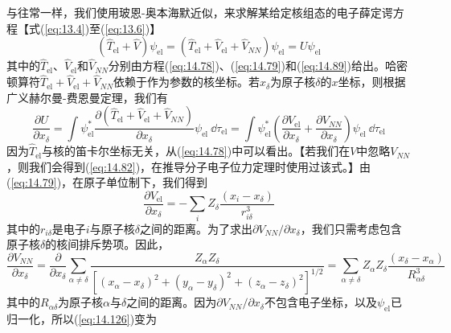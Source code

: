     与往常一样，我们使用玻恩-奥本海默近似，来求解某给定核组态的电子薛定谔方程【式(\ref{eq:13.4})至(\ref{eq:13.6})】
    \begin{equation*}
        \left(\hat{T}_{\text{el}} + \hat{V}\right) \psi_{\text{el}} = \left(\hat{T}_{\text{el}} + \hat{V}_{\text{el}} + \hat{V}_{NN}\right) \psi_{\text{el}} = U \psi_{\text{el}}
    \end{equation*}
    其中的$\hat{T}_{\text{el}}$、$\hat{V}_{\text{el}}$和$\hat{V}_{NN}$分别由方程(\ref{eq:14.78})、(\ref{eq:14.79})和(\ref{eq:14.89})给出。哈密顿算符$\hat{T}_{\text{el}} + \hat{V}_{\text{el}} + \hat{V}_{NN}$依赖于作为参数的核坐标。若$x_{\delta}$为原子核$\delta$的$x$坐标，则根据广义赫尔曼-费恩曼定理，我们有
    \begin{equation}
        \frac{\partial U}{\partial x_{\delta}} = \int \psi_{\text{el}}^* \frac{\partial\left(\hat{T}_{\text{el}} + \hat{V}_{\text{el}} + \hat{V}_{NN}\right)}{\partial x_{\delta}} \psi_{\text{el}} \:\dd \tau_{\text{el}} = \int \psi_{\text{el}}^* \left(\frac{\partial V_{\text{el}}}{\partial x_{\delta}} + \frac{\partial V_{NN}}{\partial x_{\delta}}\right) \psi_{\text{el}} \:\dd \tau_{\text{el}}
        \label{eq:14.126}
    \end{equation}
    因为$\hat{T}_{\text{el}}$与核的笛卡尔坐标无关，从(\ref{eq:14.78})中可以看出。【若我们在$V$中忽略$V_{NN}$，则我们会得到(\ref{eq:14.82})，在推导分子电子位力定理时使用过该式。】由(\ref{eq:14.79})，在原子单位制下，我们得到
    \begin{equation}
        \frac{\partial V_{\text{el}}}{\partial x_{\delta}} = - \sum_i Z_{\delta} \frac{\left(x_{i} - x_{\delta}\right)}{r_{i\delta}^3}
        \label{eq:14.127}
    \end{equation}
    其中的$r_{i\delta}$是电子$i$与原子核$\delta$之间的距离。为了求出$\partial V_{NN} / \partial x_{\delta}$，我们只需考虑包含原子核$\delta$的核间排斥势项。因此，
    \begin{equation*}
        \frac{\partial V_{NN}}{\partial x_{\delta}} = \frac{\partial}{\partial x_{\delta}} \sum_{\alpha \neq \delta} \frac{Z_{\alpha} Z_{\delta}}{\left[\left(x_{\alpha} - x_{\delta}\right)^2 + \left(y_{\alpha} - y_{\delta}\right)^2 + \left(z_{\alpha} - z_{\delta}\right)^2\right]^{1/2}} = \sum_{\alpha \neq \delta} Z_{\alpha} Z_{\delta} \frac{\left(x_{\delta} - x_{\alpha}\right)}{R_{\alpha\delta}^3}
    \end{equation*}
    其中的$R_{\alpha\delta}$为原子核$\alpha$与$\delta$之间的距离。因为$\partial V_{NN} / \partial x_{\delta}$不包含电子坐标，以及$\psi_{\text{el}}$已归一化，所以(\ref{eq:14.126})变为

